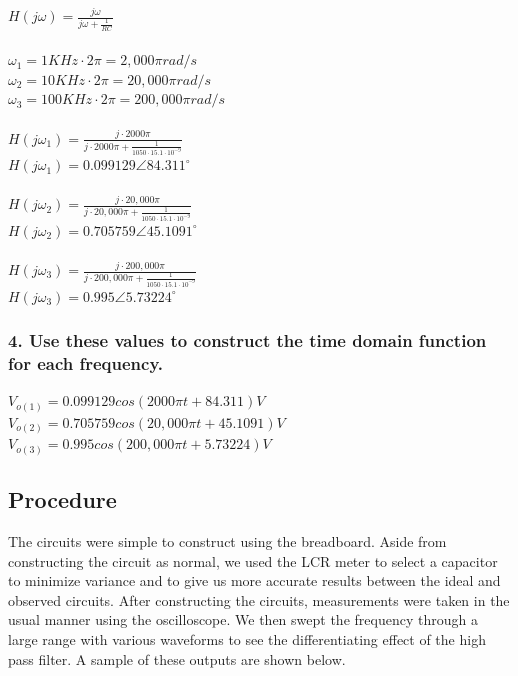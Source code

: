\documentclass[11pt]{article}
\begin{document}
	$H(j\omega)=\frac{j\omega}{j\omega+\frac{1}{RC}}$\\\\
	$\omega_{1}=1KHz\cdot 2\pi=2,000\pi rad/s$\\
	$\omega_{2}=10KHz\cdot 2\pi=20,000\pi rad/s$\\
	$\omega_{3}=100KHz\cdot 2\pi=200,000\pi rad/s$\\\\
	$H(j\omega_{1})=\frac{j\cdot 2000\pi}{j\cdot 2000\pi+\frac{1}{1050\cdot 15.1 \cdot 10^{-9}}}$\\
	$H(j\omega_{1})=0.099129 \angle84.311^{\circ} $\\\\
	$H(j\omega_{2})=\frac{j\cdot 20,000\pi}{j\cdot 20,000\pi+\frac{1}{1050\cdot 15.1 \cdot 10^{-9}}}$\\
	$H(j\omega_{2})=0.705759 \angle45.1091^{\circ} $\\\\	
	$H(j\omega_{3})=\frac{j\cdot 200,000\pi}{j\cdot 200,000\pi+\frac{1}{1050\cdot 15.1 \cdot 10^{-9}}}$\\
	$H(j\omega_{3})=0.995 \angle5.73224^{\circ} $
	
	\subsubsection*{4. Use these values to construct the time domain function for each frequency.}
	
	$V_{o(1)}=0.099129cos(2000\pi t+84.311)V$\\
	$V_{o(2)}=0.705759cos(20,000\pi t+45.1091)V$\\
	$V_{o(3)}=0.995cos(200,000\pi t+5.73224)V$\\
	\subsection*{Procedure}
	The circuits were simple to construct using the breadboard. Aside from constructing the circuit as normal, we used the LCR meter to select a capacitor to minimize variance and to give us more accurate results between the ideal and observed circuits. After constructing the circuits, measurements were taken in the usual manner using the oscilloscope. We then swept the frequency through a large range with various waveforms to see the differentiating effect of the high pass filter. A sample of these outputs are shown below.
	
\end{document}
